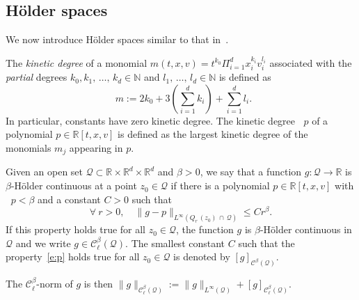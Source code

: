 \documentclass[AHL,Unicode,longabstracts,published]{cedram}
\DeclareMathOperator{\degkin}{deg_{\, kin}}
\newcommand{\N}{\mathbb{N}}
\newcommand{\R}{\mathbb{R}}
\newcommand{\cC}{\mathcal{C}}
\newcommand{\cQ}{\mathcal{Q}}
\let\oldforall\forall
\renewcommand*{\forall}{\mathrel{\oldforall}}
\begin{document}
\subsection{H\"older spaces}

We now introduce H\"older spaces similar to that in~\cite{imbert2018schauder}.
\begin{defi}\label{def:holder}
The \emph{kinetic degree} of a monomial $m (t,x,v) = t^{k_0} \Pi_{i=1}^d x_i^{k_i} v_i^{l_i}$ associated with the \emph{partial} degrees $k_0,k_1,\,\dots,\,k_d \in \N$ and $l_1,\,\dots,\,l_d \in \N$ is defined as
\[
\degkin m := 2 k_0 + 3 \left(\sum_{i=1}^d k_i\right) + \sum_{i=1}^d l_i.
\]
In particular, constants have zero kinetic degree. The kinetic degree $\degkin p$ of a polynomial $p \in \R[t,x,v]$ is defined as the largest kinetic degree of the monomials $m_j$ appearing in $p$.

Given an open set $\cQ \subset \R \times \R^d \times \R^d$ and $\beta >0$, we say that a function $g: \cQ \to \R$ is $\beta$-H\"older continuous at a point $z_0 \in \cQ$ if there is a polynomial $p \in \R [t,x,v]$ with $\degkin p < \beta$ and a constant $C>0$ such that
\begin{equation}\label{e:p}
\forall \ r >0, \quad \|g- p\|_{L^\infty\left(Q_r\,(z_0)\,\cap\,\cQ\right)} \le C r^{\beta}.
\end{equation}
If this property holds true for all $z_0 \in \cQ$, the function $g$ is $\beta$-H\"older continuous in $\cQ$ and we write $g \in \cC_\ell^\beta (\cQ)$. The smallest constant $C$ such that the property~\eqref{e:p} holds true for all $z_0 \in \cQ$ is denoted by $[g]_{\cC^{\beta}(\cQ)}$.

The $\cC_\ell^{\beta}$-norm of $g$ is then $\|g\|_{\cC_\ell^{\beta}(\cQ)} := \|g\|_{L^\infty(\cQ)} + [g]_{\cC_\ell^{\beta}(\cQ)}$.
\end{defi}
\goodbreak
\end{document}
